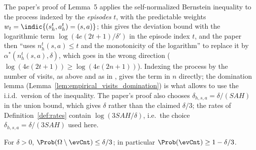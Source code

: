 \begin{remark}\label{rem:empirical_bernstein_index}
The paper's proof of Lemma~5 applies the self-normalized Bernstein inequality to the process
indexed by the \emph{episodes} $t$, with the predictable weights $w_t = \indic\{(s^t_h, a^t_h) = (s, a)\}$;
this gives the deviation bound with the logarithmic term $\log(4e(2t + 1)/\delta')$ in the
episode index $t$, and the paper then ``uses $n_h^t(s, a) \le t$ and the monotonicity of the
logarithm'' to replace it by $\alpha^*(n_h^t(s, a), \delta)$, which goes in the wrong direction
($\log(4e(2t+1)) \ge \log(4e(2n+1))$). Indexing the process by the number of visits, as above
and as in \cite{menard2021fast}, gives the term in $n$ directly; the domination lemma
(Lemma~\ref{lem:empirical_visits_domination}) is what allows to use the i.i.d.\ version of the
inequality. The paper's proof also chooses $\delta_{h, s, a} = \delta/(SAH)$ in the union bound,
which gives $\delta$ rather than the claimed $\delta/3$; the rates of Definition~\ref{def:rates}
contain $\log(3SAH/\delta)$, i.e.\ the choice $\delta_{h, s, a} = \delta/(3SAH)$ used here.
\end{remark}

\begin{lemma}\label{lem:event_cnt_prob}
\leanok
{}
For $\delta > 0$, $\Prob(\Omega \setminus \evCnt) \le \delta/3$; in particular $\Prob(\evCnt) \ge 1 - \delta/3$.
\end{lemma}


